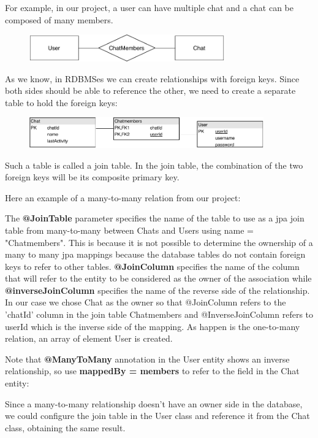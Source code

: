 \documentclass[a4paper]{article}
\begin{document}
For example, in our project, a user can have multiple chat and a chat can be composed of many members.

\begin{figure}[h]
\centering
\includegraphics[width=0.75\textwidth]{dia1.pdf}
\end{figure}

As we know, in RDBMSes we can create relationships with foreign keys. Since both sides should be able to reference the other, we need to create a separate table to hold the foreign keys:

\begin{figure}[h]
\centering
\includegraphics[width=0.90\textwidth]{dia2.pdf}
\end{figure}

Such a table is called a join table. In the join table, the combination of the two foreign keys will be its composite primary key.

Here an example of a many-to-many relation from our project:


The \textbf{@JoinTable} parameter specifies the name of the table to use as a jpa join table from many-to-many between Chats and Users using name = "Chatmembers". This is because it is not possible to determine the ownership of a many to many jpa mappings because the database tables do not contain foreign keys to refer to other tables. \textbf{@JoinColumn} specifies the name of the column that will refer to the entity to be considered as the owner of the association while \textbf{@inverseJoinColumn} specifies the name of the reverse side of the relationship. In our case we chose Chat as the owner so that @JoinColumn refers to the 'chatId' column in the join table Chatmembers and @InverseJoinColumn refers to userId which is the inverse side of the mapping. As happen is the one-to-many relation, an array of element User is created.

Note that \textbf{@ManyToMany} annotation in the User entity shows an inverse relationship, so use \textbf{mappedBy = members} to refer to the field in the Chat entity:

Since a many-to-many relationship doesn't have an owner side in the database, we could configure the join table in the User class and reference it from the Chat class, obtaining the same result.
\end{document}
